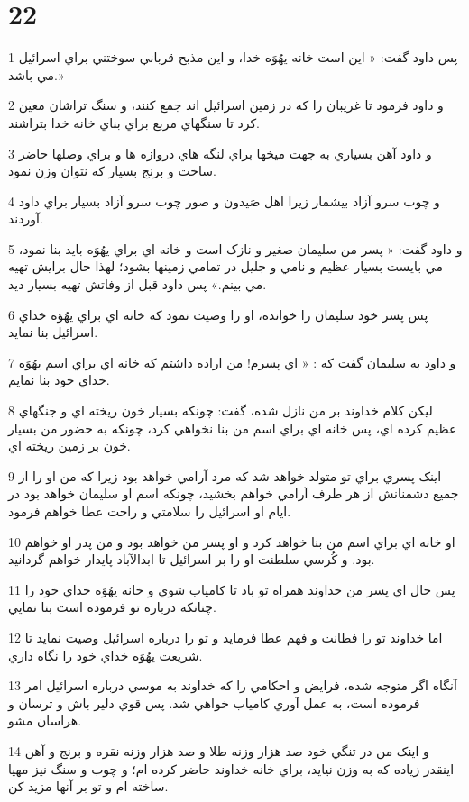 \chapter{22}

\par 1 پس داود گفت: « اين است خانه يهُوَه خدا، و اين مذبح قرباني سوختني براي اسرائيل مي باشد.»
\par 2 و داود فرمود تا غريبان را که در زمين اسرائيل اند جمع کنند، و سنگ تراشان معين کرد تا سنگهاي مربع براي بناي خانه خدا بتراشند.
\par 3 و داود آهن بسياري به جهت ميخها براي لنگه هاي دروازه ها و براي وصلها حاضر ساخت و برنج بسيار که نتوان وزن نمود.
\par 4 و چوب سرو آزاد بيشمار زيرا اهل صَيدون و صور چوب سرو آزاد بسيار براي داود آوردند.
\par 5 و داود گفت: « پسر من سليمان صغير و نازک است و خانه اي براي يهُوَه بايد بنا نمود، مي بايست بسيار عظيم و نامي و جليل در تمامي زمينها بشود؛ لهذا حال برايش تهيه مي بينم.» پس داود قبل از وفاتش تهيه بسيار ديد.
\par 6 پس پسر خود سليمان را خوانده، او را وصيت نمود که خانه اي براي يهُوَه خداي اسرائيل بنا نمايد.
\par 7 و داود به سليمان گفت که : « اي پسرم! من اراده داشتم که خانه اي براي اسم يهُوَه خداي خود بنا نمايم.
\par 8 ليکن کلام خداوند بر من نازل شده، گفت: چونکه بسيار خون ريخته اي و جنگهاي عظيم کرده اي، پس خانه اي براي اسم من بنا نخواهي کرد، چونکه به حضور من بسيار خون بر زمين ريخته اي.
\par 9 اينک پسري براي تو متولد خواهد شد که مرد آرامي خواهد بود زيرا که من او را از جميع دشمنانش از هر طرف آرامي خواهم بخشيد، چونکه اسم او سليمان خواهد بود در ايام او اسرائيل را سلامتي و راحت عطا خواهم فرمود.
\par 10 او خانه اي براي اسم من بنا خواهد کرد و او پسر من خواهد بود و من پدر او خواهم بود. و کُرسي سلطنت او را بر اسرائيل تا ابدالآباد پايدار خواهم گردانيد.
\par 11 پس حال اي پسر من خداوند همراه تو باد تا کامياب شوي و خانه يهُوَه خداي خود را چنانکه درباره تو فرموده است بنا نمايي.
\par 12 اما خداوند تو را فطانت و فهم عطا فرمايد و تو را درباره اسرائيل وصيت نمايد تا شريعت يهُوَه خداي خود را نگاه داري.
\par 13 آنگاه اگر متوجه شده، فرايض و احکامي را که خداوند به موسي درباره اسرائيل امر فرموده است، به عمل آوري کامياب خواهي شد. پس قوي دلير باش و ترسان و هراسان مشو.
\par 14 و اينک من در تنگي خود صد هزار وزنه طلا و صد هزار وزنه نقره و برنج و آهن اينقدر زياده که به وزن نيايد، براي خانه خداوند حاضر کرده ام؛ و چوب و سنگ نيز مهيا ساخته ام و تو بر آنها مزيد کن.
